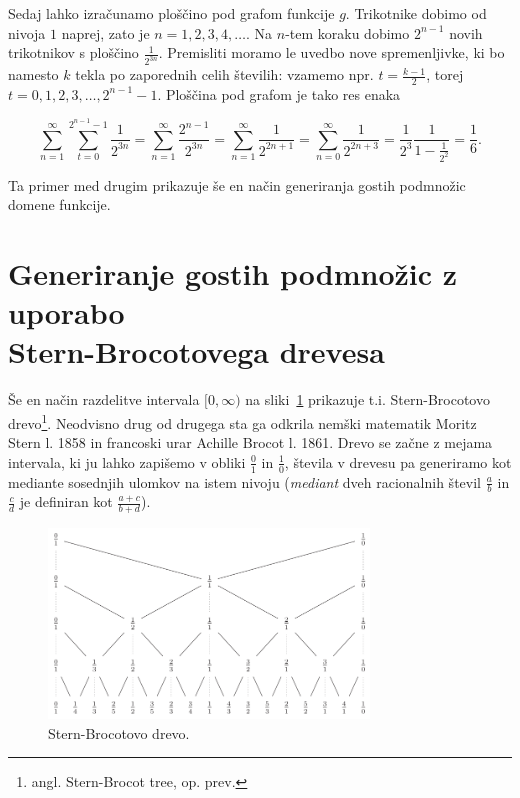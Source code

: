 \documentclass[a4paper, 12pt, titlepage]{article}
\begin{document}
Sedaj lahko izračunamo ploščino pod grafom funkcije $ g $. Trikotnike dobimo od nivoja $ 1 $ naprej, zato je $ n = 1, 2, 3, 4, \ldots $. Na $ n $-tem koraku dobimo $ 2^{n-1} $ novih trikotnikov s ploščino $ \frac{1}{2^{3n}} $. Premisliti moramo le uvedbo nove spremenljivke, ki bo namesto $ k $ tekla po zaporednih celih številih: vzamemo npr. $ t = \frac{k-1}{2} $, torej $ t = 0, 1, 2, 3, \ldots, 2^{n-1}-1 $. Ploščina pod grafom je tako res enaka

\begin{equation*}
    \sum_{n=1}^{\infty} \sum_{t=0}^{2^{n-1}-1} \frac{1}{2^{3n}} = \sum_{n=1}^{\infty} \frac{2^{n-1}}{2^{3n}} = \sum_{n=1}^{\infty} \frac{1}{2^{2n+1}} = \sum_{n=0}^{\infty} \frac{1}{2^{2n+3}} = \frac{1}{2^3} \frac{1}{1-\frac{1}{2^2}} = \frac{1}{6}\text{.}
\end{equation*}

\noindent Ta primer med drugim prikazuje še en način generiranja gostih podmnožic domene funkcije.

\section[Generiranje gostih podmnožic z uporabo Stern-Brocotovega drevesa]{Generiranje gostih podmnožic z uporabo\\ Stern-Brocotovega drevesa }

Še en način razdelitve intervala $ [0, \infty) $ na sliki~\ref{stern-brocot_tree} prikazuje t.i. Stern-Brocotovo drevo\footnote{angl. Stern-Brocot tree, op. prev.}. Neodvisno drug od drugega sta ga odkrila nemški matematik Moritz Stern l. 1858 in francoski urar Achille Brocot l. 1861. Drevo se začne z mejama intervala, ki ju lahko zapišemo v obliki $ \frac{0}{1}$ in $ \frac{1}{0} $, števila v drevesu pa generiramo kot mediante sosednjih ulomkov na istem nivoju (\emph{mediant} dveh racionalnih števil $ \frac{a}{b} $ in $ \frac{c}{d} $ je definiran kot $ \frac{a+c}{b+d} $).

\begin{figure}[h!]
    \centering
    \includegraphics[width=0.76\textwidth]{slike/stern-brocot_tree.png}
    \caption{Stern-Brocotovo drevo.}
    \label{stern-brocot_tree}
\end{figure}
\end{document}
